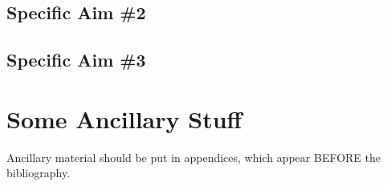 \documentclass[11pt,proposal]{ucthesis}
\begin{document}
\section{Specific Aim \#2}

\section{Specific Aim \#3}

\appendix
\chapter{Some Ancillary Stuff}

Ancillary material should be put in appendices, which appear BEFORE the
bibliography. 


\nocite{*}

\def\baselinestretch{1.0}\large\normalsize



\end{document}
